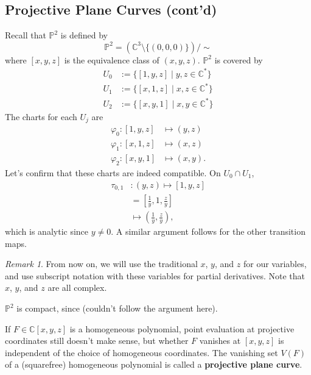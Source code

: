 \documentclass[12pt]{article}
\newcommand{\cx}{\mathbb{C}}
\newcommand{\p}{\mathbb{P}}
\theoremstyle{definition}
\theoremstyle{remark}
\newtheorem*{remark}{Remark}
\begin{document}
\subsection{Projective Plane Curves (cont'd)}
Recall that $\p^2$ is defined by 
\begin{equation}
    \p^2=\left(\cx^3\setminus\{(0,0,0)\}\right)\big/\sim
\end{equation}
where $[x,y,z]$ is the equivalence class of $(x,y,z)$. $\p^2$ is covered by 
\begin{equation}
    \begin{split}
        U_0&:=\{[1,y,z]\mid y,z\in\cx^*\}\\
        U_1&:=\{[x,1,z]\mid x,z\in\cx^*\}\\
        U_2&:=\{[x,y,1]\mid x,y\in\cx^*\}
    \end{split}
\end{equation}
The charts for each $U_j$ are 
\begin{equation}
    \begin{split}
        \varphi_0:[1,y,z]&\mapsto(y,z)\\
        \varphi_1:[x,1,z]&\mapsto(x,z)\\
        \varphi_2:[x,y,1]&\mapsto(x,y).
    \end{split}
\end{equation}
Let's confirm that these charts are indeed compatible. On $U_0\cap U_1$, 
\begin{equation}
    \begin{split}
        \tau_{0,1}&:(y,z)\mapsto[1,y,z]\\
        &=\left[\frac{1}{y},1,\frac{z}{y}\right]\\
        &\mapsto\left(\frac{1}{y},\frac{z}{y}\right),
    \end{split}
\end{equation}
which is analytic since $y\neq0$. A similar argument follows for the other transition maps.
\begin{remark}
    From now on, we will use the traditional $x$, $y$, and $z$ for our variables, and use subscript notation with these variables for partial derivatives. Note that $x$, $y$, and $z$ are all complex.
\end{remark}
$\p^2$ is compact, since (couldn't follow the argument here). 

If $F\in\cx[x,y,z]$ is a homogeneous polynomial, point evaluation at projective coordinates still doesn't make sense, but whether $F$ vanishes at $[x,y,z]$ is independent of the choice of homogeneous coordinates. The vanishing set $V(F)$ of a (squarefree) homogeneous polynomial is called a \textbf{projective plane curve}.
\end{document}
